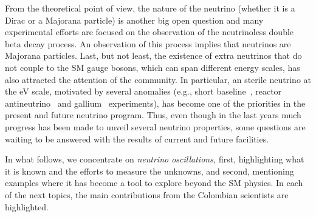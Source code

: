 \documentclass[a4paper,11pt]{article}
\begin{document}
From the theoretical point of view, the nature of the neutrino (whether it is a Dirac or a Majorana particle) is another big open question and many experimental efforts are focused on the observation of the neutrinoless double beta decay process. An observation of this process implies that neutrinos are Majorana particles. Last, but not least, the existence of extra neutrinos that do not couple to the SM gauge bosons, which can span different energy scales, has also attracted the attention of the community. In particular, an sterile neutrino at the eV scale, motivated by several anomalies (e.g., short baseline~\cite{Aguilar:2001ty, Aguilar-Arevalo:2013pmq}, reactor antineutrino~\cite{Mueller:2011nm} and gallium~\cite{Acero:2007su, Giunti:2010zu} experiments), has become one of the priorities in the present and future neutrino program. Thus, even though in the last years much progress has been made to unveil several neutrino properties, some questions are waiting to be answered with the results of current and future facilities.

In what follows, we concentrate on {\it neutrino oscillations,} first, highlighting what it is known and the efforts to measure the unknowns, and second, mentioning examples where it has become a tool to explore beyond the SM physics. In each of the next topics, the main contributions from the Colombian scientists are highlighted.
\end{document}
